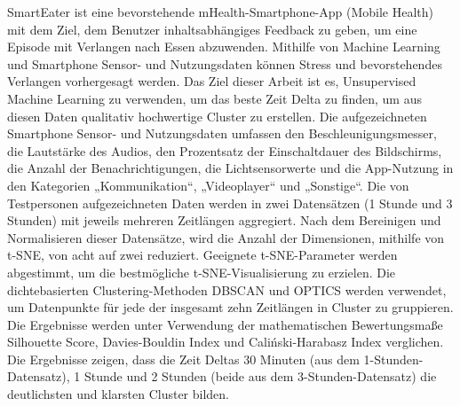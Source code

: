 SmartEater ist eine bevorstehende mHealth-Smartphone-App (Mobile Health) mit dem Ziel, dem Benutzer inhaltsabhängiges Feedback zu geben, um eine Episode mit Verlangen nach Essen abzuwenden. Mithilfe von Machine Learning und Smartphone Sensor- und Nutzungsdaten können Stress und bevorstehendes Verlangen vorhergesagt werden. Das Ziel dieser Arbeit ist es, Unsupervised Machine Learning zu verwenden, um das beste Zeit Delta zu finden, um aus diesen Daten qualitativ hochwertige Cluster zu erstellen. Die aufgezeichneten Smartphone Sensor- und Nutzungsdaten umfassen den Beschleunigungsmesser, die Lautstärke des Audios, den Prozentsatz der Einschaltdauer des Bildschirms, die Anzahl der Benachrichtigungen, die Lichtsensorwerte und die App-Nutzung in den Kategorien „Kommunikation“, „Videoplayer“ und „Sonstige“. Die von Testpersonen aufgezeichneten Daten werden in zwei Datensätzen (1 Stunde und 3 Stunden) mit jeweils mehreren Zeitlängen aggregiert. Nach dem Bereinigen und Normalisieren dieser Datensätze, wird die Anzahl der Dimensionen, mithilfe von t-SNE, von acht auf zwei reduziert. Geeignete t-SNE-Parameter werden abgestimmt, um die bestmögliche t-SNE-Visualisierung zu erzielen. Die dichtebasierten Clustering-Methoden DBSCAN und OPTICS werden verwendet, um Datenpunkte für jede der insgesamt zehn Zeitlängen in Cluster zu gruppieren. Die Ergebnisse werden unter Verwendung der mathematischen Bewertungsmaße Silhouette Score, Davies-Bouldin Index und Caliński-Harabasz Index verglichen. Die Ergebnisse zeigen, dass die Zeit Deltas 30 Minuten (aus dem 1-Stunden-Datensatz), 1 Stunde und 2 Stunden (beide aus dem 3-Stunden-Datensatz) die deutlichsten und klarsten Cluster bilden.